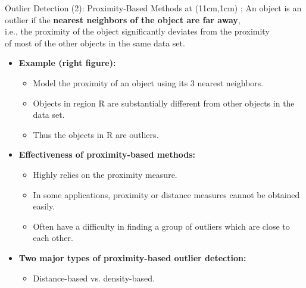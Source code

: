 \begin{frame}{Outlier Detection (2): Proximity-Based Methods}
	\tikzoverlay at (11cm,1cm) {};
	An object is an outlier if the \textbf{\color{airforceblue}nearest neighbors of the object are far away},\\ i.e., the proximity of the object significantly deviates from the proximity\\ of most of the other objects in the same data set.
	\begin{itemize}

		\item \textbf{Example (right figure):}
		      \begin{itemize}
			      \item Model the proximity of an object using its 3 nearest neighbors.
			      \item Objects in region R are substantially different from other objects in the data set.
			      \item Thus the objects in R are outliers.
		      \end{itemize}
		\item \textbf{Effectiveness of proximity-based methods:}
		      \begin{itemize}
			      \item Highly relies on the proximity measure.
			      \item In some applications, proximity or distance measures cannot be obtained easily.
			      \item Often have a difficulty in finding a group of outliers which are close to each other.
		      \end{itemize}
		\item \textbf{Two major types of proximity-based outlier detection:}
		      \begin{itemize}
			      \item Distance-based vs. density-based.
		      \end{itemize}
	\end{itemize}
\end{frame}



